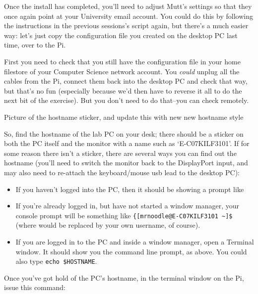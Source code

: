 Once the install has completed, you'll need to adjust Mutt's settings so that they once again point at your University email account. You could do this by following the instructions in the previous sessions's script again, but there's a much easier way: let's just copy the configuration file you created on the desktop PC last time, over to the Pi. 

First you need to check that you still have the  configuration file in your home filestore of your Computer Science network account. You \textit{could} unplug all the cables from the Pi, connect them back into the desktop PC and check that way, but that's no fun (especially because we'd then have to reverse it all to do the next bit of the exercise). But you don't need to do that--you can check remotely. 


\begin{note}
Picture of the hostname sticker, and update this with new new hostname style
\end{note}

So, find the hostname of the lab PC on your desk; there should be a sticker on both the PC itself and the monitor with a name such as `E-C07KILF3101'. If for some reason there isn't a sticker, there are several ways you can find out the hostname (you'll need to switch the monitor back to the DisplayPort input, and may also need to re-attach the keyboard/mouse usb lead to the desktop PC):

\begin{itemize}
\item If you haven't logged into the PC, then it should be showing a prompt like  
\item If you're already logged in, but have not started a window manager, your console prompt will be something like  \verb|{[mrnoodle@E-C07KILF3101 ~]$| (where  would be replaced by your own username, of course).
\item If you are logged in to the PC and inside a window manager, open a Terminal window. It should show you the command line prompt, as above. You could also type \verb|echo $HOSTNAME|.
\end{itemize}

Once you've got hold of the PC's hostname, in the terminal window on the Pi, issue this command:


